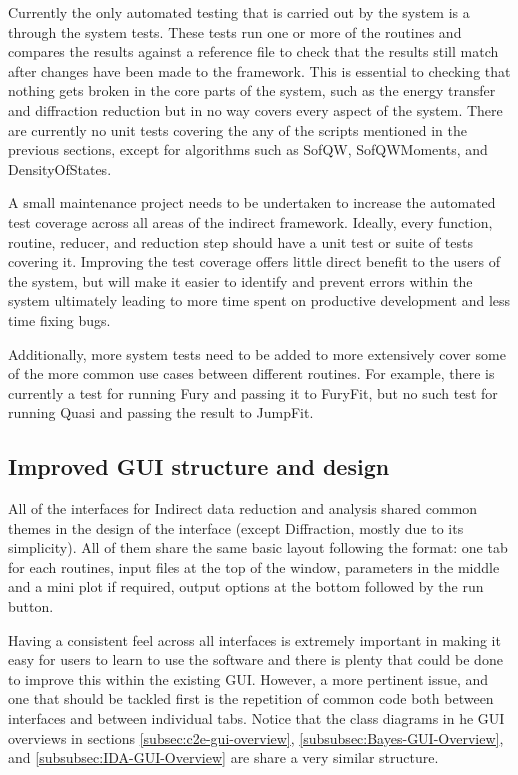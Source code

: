 \documentclass[paper=a4, fontsize=11pt]{scrartcl}	%
\numberwithin{equation}{section}															%
\numberwithin{figure}{section}																%
\numberwithin{table}{section}																%
\begin{document}
Currently the only automated testing that is carried out by the system is a through the system tests. These tests run one or more of the routines and compares the results against a reference file to check that the results still match after changes have been made to the framework. This is essential to checking that nothing gets broken in the core parts of the system, such as the energy transfer and diffraction reduction but in no way covers every aspect of the system. There are currently no unit tests covering the any of the scripts mentioned in the previous sections, except for algorithms such as SofQW, SofQWMoments, and DensityOfStates.

A small maintenance project needs to be undertaken to increase the automated test coverage across all areas of the indirect framework. Ideally, every function, routine, reducer, and reduction step should have a unit test or suite of tests covering it. Improving the test coverage offers little direct benefit to the users of the system, but will make it easier to identify and prevent errors within the system ultimately leading to more time spent on productive development and less time fixing bugs.

Additionally, more system tests need to be added to more extensively cover some of the more common use cases between different routines. For example, there is currently a test for running Fury and passing it to FuryFit, but no such test for running Quasi and passing the result to JumpFit.

\subsection{Improved GUI structure and design}
\label{subsec:GUI-Improvements}
All of the interfaces for Indirect data reduction and analysis shared common themes in the design of the interface (except Diffraction, mostly due to its simplicity). All of them share the same basic layout following the format: one tab for each routines, input files at the top of the window, parameters in the middle and a mini plot if required, output options at the bottom followed by the run button.

Having a consistent feel across all interfaces is extremely important in making it easy for users to learn to use the software \cite{cwickens2004} and there is plenty that could be done to improve this within the existing GUI. However, a more pertinent issue, and one that should be tackled first is the repetition of common code both between interfaces and between individual tabs. Notice that the class diagrams in he GUI overviews in sections \ref{subsec:c2e-gui-overview}, \ref{subsubsec:Bayes-GUI-Overview}, and \ref{subsubsec:IDA-GUI-Overview} are share a very similar structure.
\end{document}
